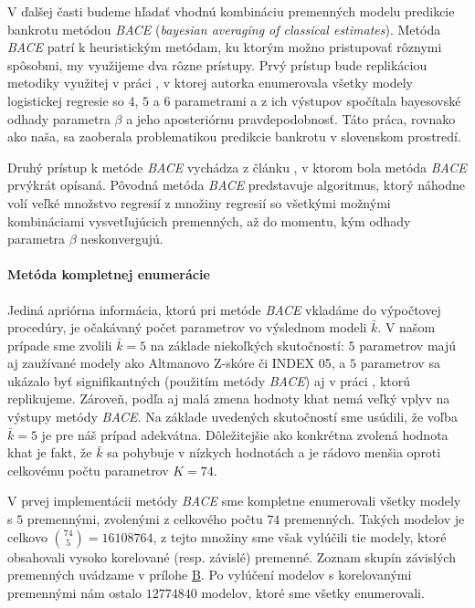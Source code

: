 V ďalšej časti budeme hľadať vhodnú kombináciu premenných modelu predikcie bankrotu metódou \emph{BACE} (\emph{bayesian averaging of classical estimates}).
Metóda \emph{BACE} patrí k heuristickým metódam, ku ktorým možno pristupovať rôznymi spôsobmi, my využijeme dva rôzne prístupy.
Prvý prístup bude replikáciou metodiky využitej v práci \cite{ondrusekova}, v ktorej autorka enumerovala všetky modely logistickej regresie so \(4\), \(5\) a \(6\) parametrami
a z ich výstupov spočítala bayesovské odhady parametra \(\beta\) a jeho aposteriórnu pravdepodobnosť.
Táto práca, rovnako ako naša, sa zaoberala problematikou predikcie bankrotu v slovenskom prostredí.

Druhý prístup k metóde \emph{BACE} vychádza z článku \cite{sala-i-martin}, v ktorom bola metóda \emph{BACE} prvýkrát opísaná.
Pôvodná metóda \emph{BACE} predstavuje algoritmus, ktorý náhodne volí veľké množstvo regresií z množiny regresií so všetkými možnými kombináciami vysvetľujúcich premenných,
až do momentu, kým odhady parametra \(\beta\) neskonvergujú.

\paragraph{Metóda kompletnej enumerácie}

Jediná apriórna informácia, ktorú pri metóde \emph{BACE} vkladáme do výpočtovej procedúry, je očakávaný počet parametrov vo výslednom modeli \( \bar{k} \).
V našom prípade sme zvolili \( \bar{k} = 5 \) na základe niekoľkých skutočností: \(5\) parametrov majú aj zaužívané modely ako Altmanovo Z-skóre či INDEX 05,
a \(5\) parametrov sa ukázalo byť signifikantných (použitím metódy \emph{BACE}) aj v práci \cite{ondrusekova}, ktorú replikujeme.
Zároveň, podľa \cite{sala-i-martin} aj \cite{polaci} malá zmena hodnoty khat nemá veľký vplyv na výstupy metódy \emph{BACE}.
Na základe uvedených skutočností sme usúdili, že voľba \( \bar{k} = 5 \) je pre náš prípad adekvátna.
Dôležitejšie ako konkrétna zvolená hodnota khat je fakt, že \( \bar{k} \) sa pohybuje v nízkych hodnotách a je rádovo menšia oproti celkovému počtu parametrov \( K = 74 \).

V prvej implementácii metódy \emph{BACE} sme kompletne enumerovali všetky modely s \(5\) premennými, zvolenými z celkového počtu \(74\) premenných.
Takých modelov je celkovo \(\binom{74}{5} = 16108764\), z tejto množiny sme však vylúčili tie modely, ktoré obsahovali vysoko korelované (resp. závislé) premenné.
Zoznam skupín závislých premenných uvádzame v prílohe \hyperref[appendix:b]{B}. 
Po vylúčení modelov s korelovanými premennými nám ostalo \(12774840\) modelov, ktoré sme všetky enumerovali.

